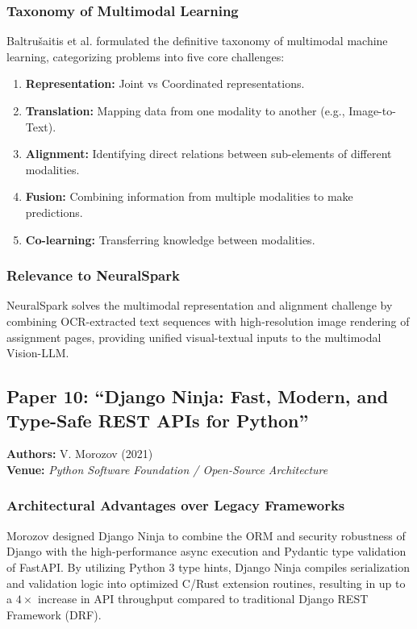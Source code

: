 \subsubsection{Taxonomy of Multimodal Learning}
Baltru\v{s}aitis et al. formulated the definitive taxonomy of multimodal machine learning, categorizing problems into five core challenges:
\begin{enumerate}[leftmargin=*]
    \item \textbf{Representation:} Joint vs Coordinated representations.
    \item \textbf{Translation:} Mapping data from one modality to another (e.g., Image-to-Text).
    \item \textbf{Alignment:} Identifying direct relations between sub-elements of different modalities.
    \item \textbf{Fusion:} Combining information from multiple modalities to make predictions.
    \item \textbf{Co-learning:} Transferring knowledge between modalities.
\end{enumerate}

\subsubsection{Relevance to NeuralSpark}
NeuralSpark solves the multimodal representation and alignment challenge by combining OCR-extracted text sequences with high-resolution image rendering of assignment pages, providing unified visual-textual inputs to the multimodal Vision-LLM.

\subsection{Paper 10: ``Django Ninja: Fast, Modern, and Type-Safe REST APIs for Python''}
\textbf{Authors:} V. Morozov (2021) \cite{morozov2021} \\
\textbf{Venue:} \textit{Python Software Foundation / Open-Source Architecture}

\subsubsection{Architectural Advantages over Legacy Frameworks}
Morozov designed Django Ninja to combine the ORM and security robustness of Django with the high-performance async execution and Pydantic type validation of FastAPI. By utilizing Python 3 type hints, Django Ninja compiles serialization and validation logic into optimized C/Rust extension routines, resulting in up to a $4\times$ increase in API throughput compared to traditional Django REST Framework (DRF).

